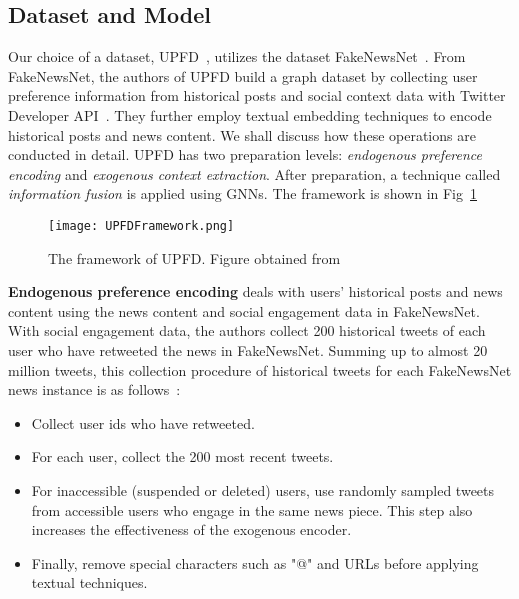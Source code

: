 \subsection{Dataset and Model}
\label{subsec:mixedApproaches_DatasetAndModel}
Our choice of a dataset, UPFD~\parencite{UPFD_Dataset_Shu}, utilizes the dataset FakeNewsNet~\parencite{FakeNewsNet_Shu}. From FakeNewsNet, the authors of UPFD build a graph dataset by collecting user preference information from historical posts and social context data with Twitter Developer API~\parencite{TwitterAPI_Twitter}. They further employ textual embedding techniques to encode historical posts and news content. We shall discuss how these operations are conducted in detail. UPFD has two preparation levels: \emph{endogenous preference encoding} and \emph{exogenous context extraction}. After preparation, a technique called \emph{information fusion} is applied using GNNs. The framework is shown in Fig~\ref{fig:UPFD_Framework}\\
\begin{figure}
    \centering
    \texttt{[image: UPFDFramework.png]}
    \caption[UPFD Framework.]{The framework of UPFD. Figure obtained from~\parencite{UPFD_Dataset_Shu}}
    \label{fig:UPFD_Framework}
\end{figure}
\textbf{Endogenous preference encoding} deals with users' historical posts and news content using the news content and social engagement data in FakeNewsNet. With social engagement data, the authors collect 200 historical tweets of each user who have retweeted the news in FakeNewsNet. Summing up to almost 20 million tweets, this collection procedure of historical tweets for each FakeNewsNet news instance is as follows~\parencite{UPFD_Dataset_Shu}:
\begin{itemize}
    \item Collect user ids who have retweeted.
    \item For each user, collect the 200 most recent tweets.
    \item For inaccessible (suspended or deleted) users, use randomly sampled tweets from accessible users who engage in the same news piece. This step also increases the effectiveness of the exogenous encoder.
    \item  Finally, remove special characters such as "@" and URLs before applying textual techniques.
\end{itemize}

